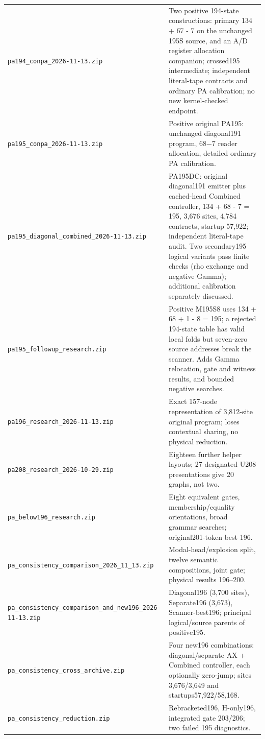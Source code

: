 \begin{longtable}{@{}p{}p{}@{}}
\nolinkurl{pa194_conpa_2026-11-13.zip} & Two positive 194-state constructions: primary 134 + 67 - 7 on the unchanged 195S source, and an A/D register allocation companion; crossed195 intermediate; independent literal-tape contracts and ordinary PA calibration; no new kernel-checked endpoint. \\[4pt]
\nolinkurl{pa195_conpa_2026-11-13.zip} & Positive original PA195: unchanged diagonal191 program, 68$-$7 reader allocation, detailed ordinary PA calibration. \\[4pt]
\nolinkurl{pa195_diagonal_combined_2026-11-13.zip} & PA195DC: original diagonal191 emitter plus cached-head Combined controller, 134 + 68 - 7 = 195, 3,676 sites, 4,784 contracts, startup 57,922; independent literal-tape audit. Two secondary195 logical variants pass finite checks (rho exchange and negative Gamma); additional calibration separately discussed. \\[4pt]
\nolinkurl{pa195_followup_research.zip} & Positive M195S8 uses 134 + 68 + 1 - 8 = 195; a rejected 194-state table has valid local folds but seven-zero source addresses break the scanner. Adds Gamma relocation, gate and witness results, and bounded negative searches. \\[4pt]
\nolinkurl{pa196_research_2026-11-13.zip} & Exact 157-node representation of 3,812-site original program; loses contextual sharing, no physical reduction. \\[4pt]
\nolinkurl{pa208_research_2026-10-29.zip} & Eighteen further helper layouts; 27 designated U208 presentations give 20 graphs, not two. \\[4pt]
\nolinkurl{pa_below196_research.zip} & Eight equivalent gates, membership/equality orientations, broad grammar searches; original201-token best 196. \\[4pt]
\nolinkurl{pa_consistency_comparison_2026_11_13.zip} & Modal-head/explosion split, twelve semantic compositions, joint gate; physical results 196–200. \\[4pt]
\nolinkurl{pa_consistency_comparison_and_new196_2026-11-13.zip} & Diagonal196 (3,700 sites), Separate196 (3,673), Scanner-best196; principal logical/source parents of positive195. \\[4pt]
\nolinkurl{pa_consistency_cross_archive.zip} & Four new196 combinations: diagonal/separate AX + Combined controller, each optionally zero-jump; sites 3,676/3,649 and startups57,922/58,168. \\[4pt]
\nolinkurl{pa_consistency_reduction.zip} & Rebracketed196, H-only196, integrated gate 203/206; two failed 195 diagnostics. \\[4pt]

\end{longtable}
